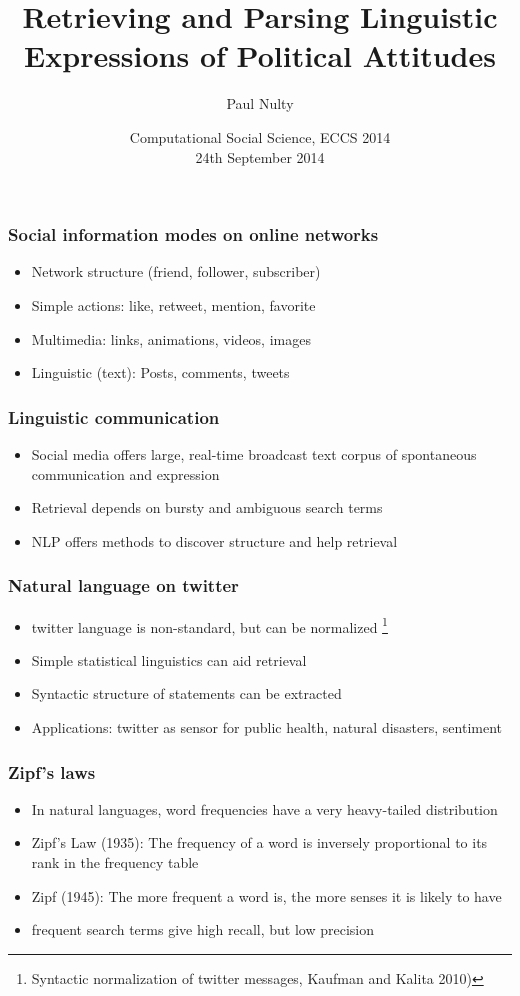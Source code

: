 \documentclass[11pt, table, dvipsnames]{beamer}
\title[Retrieving and Parsing Linguistic Expressions of Political Attitudes]{Retrieving and Parsing Linguistic Expressions of Political Attitudes}
\author{Paul Nulty}
\institute %
{
  Department of Methodology, \\
  London School of Economics and Political Science, \\
  \vspace{2 mm}
  \textit{QUANTESS} ERC Project 
}
\date %
{Computational Social Science, ECCS 2014 \\ 
24th September 2014}
\begin{document}
\begin{frame}%
\titlepage
\end{frame}


\begin{frame}
  \frametitle{Social information modes on online networks}
 \begin{itemize}
  \item Network structure (friend, follower, subscriber)
  \item Simple actions: like, retweet, mention, favorite
  \item Multimedia: links, animations, videos, images
  \item Linguistic (text): Posts, comments, tweets
  \end{itemize}
\end{frame}

\begin{frame}
  \frametitle{Linguistic communication}
  \begin{itemize}
  \item Social media offers large, real-time broadcast text corpus of spontaneous communication and expression
  \item Retrieval depends on bursty and ambiguous search terms
  \item NLP offers methods to discover structure and help retrieval
  \end{itemize}
\end{frame}

\begin{frame}
  \frametitle{Natural language on twitter}
  \begin{itemize}
  \item twitter language is non-standard, but can be normalized \footnote{Syntactic normalization of twitter messages, Kaufman and Kalita 2010)}
  \item Simple statistical linguistics can aid retrieval
  \item Syntactic structure of statements can be extracted
  \item Applications: twitter as sensor for public health, natural disasters, sentiment
  \end{itemize}
\end{frame}


\begin{frame}
  \frametitle{Zipf's laws}
  \begin{itemize}
  \item In natural languages, word frequencies have a very heavy-tailed distribution
  \item Zipf's Law (1935): The frequency of a word is inversely proportional to its rank in the frequency table
  \item Zipf (1945): The more frequent a word is, the more senses it is likely to have
  \item frequent search terms give high recall, but low precision
  \end{itemize}
\end{frame}
\end{document}
